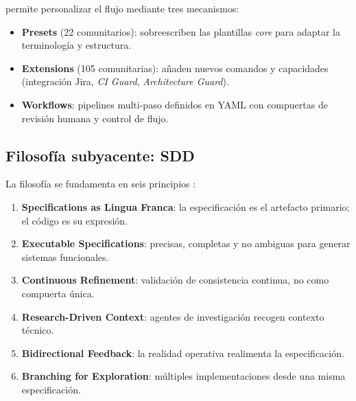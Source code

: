 \speckit{} permite personalizar el flujo mediante tres mecanismos:

\begin{itemize}
    \item \textbf{Presets} (22 comunitarios): sobreescriben las plantillas \emph{core} para adaptar la terminolog\'ia y estructura.
    \item \textbf{Extensions} (105 comunitarias): a\~naden nuevos comandos y capacidades (integraci\'on Jira, \emph{CI Guard}, \emph{Architecture Guard}).
    \item \textbf{Workflows}: pipelines multi-paso definidos en YAML con compuertas de revisi\'on humana y control de flujo.
\end{itemize}

\subsection{Filosof\'ia subyacente: SDD}

La filosof\'ia \sdd{} se fundamenta en seis principios \cite{speckit_sdd}:

\begin{enumerate}
    \item \textbf{Specifications as Lingua Franca}: la especificaci\'on es el artefacto primario; el c\'odigo es su expresi\'on.
    \item \textbf{Executable Specifications}: precisas, completas y no ambiguas para generar sistemas funcionales.
    \item \textbf{Continuous Refinement}: validaci\'on de consistencia continua, no como compuerta \'unica.
    \item \textbf{Research-Driven Context}: agentes de investigaci\'on recogen contexto t\'ecnico.
    \item \textbf{Bidirectional Feedback}: la realidad operativa realimenta la especificaci\'on.
    \item \textbf{Branching for Exploration}: m\'ultiples implementaciones desde una misma especificaci\'on.
\end{enumerate}
